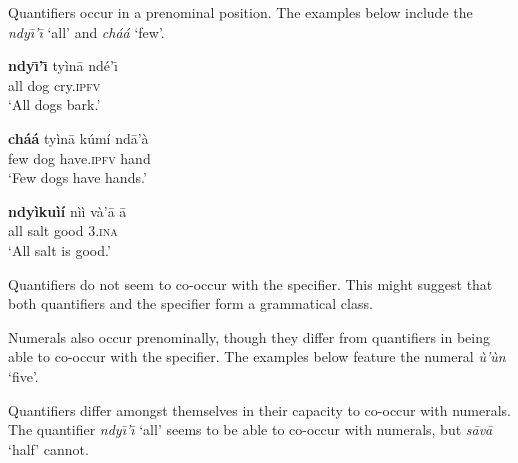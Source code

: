 \documentclass[output=paper,modfonts,nonflat]{langsci/langscibook}
\begin{document}
Quantifiers occur in a prenominal position.  The examples below include the  \textit{ndy\=\i'\=\i} `all' and \textit{ch\'a\'a} `few'.


\ea {}\label{ex:cisneros:31}
\gll
{\ob}\textbf{ndy\=\i'\=\i} ty\`in\=a{\cb} nd\'e'\=\i\\
{\db}all dog cry.\textsc{ipfv}\\
\glt
`All dogs bark.'
\z 

\ea {}\label{ex:cisneros:32}
\gll
{\ob}\textbf{ch\'a\'a} ty\`in\=a{\cb} k\'um\'i nd\=a'\`a\\
{\db}few dog have.\textsc{ipfv} hand\\
\glt
`Few dogs have hands.'
\z 

\ea {}\label{ex:cisneros:33}
\gll
{\ob}\textbf{ndy\`iku\`i\'i} n\`i\`i{\cb} v\`a'\=a \=a\\
{\db}all salt good 3.\textsc{ina}\\
\glt
`All salt is good.'
\z 

Quantifiers do not seem to co-occur with the specifier.  This might suggest that both quantifiers and the specifier form a grammatical class.

\z 

Numerals also occur prenominally, though they differ from quantifiers in being able to co-occur with the specifier.  The examples below feature the numeral \textit{\`u'\`un} `five'.

\z 

\z 

Quantifiers differ amongst themselves in their capacity to co-occur with numerals.  The quantifier \textit{ndy\=\i'\=\i} `all' seems to be able to co-occur with numerals, but \textit{s\=av\=a} `half' cannot.
\end{document}
